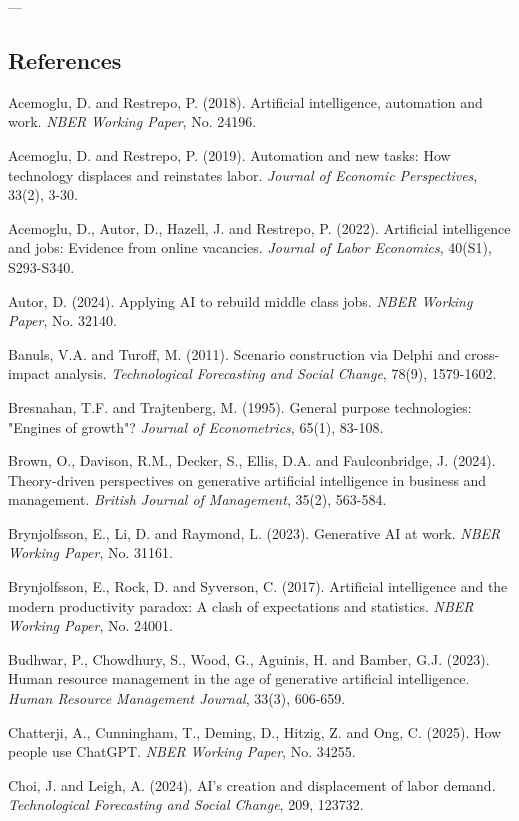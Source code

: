 \documentclass{article}
\begin{document}
---


\subsection{References}
\label{sec:references}

Acemoglu, D. and Restrepo, P. (2018). Artificial intelligence, automation and work. \textit{NBER Working Paper}, No. 24196.

Acemoglu, D. and Restrepo, P. (2019). Automation and new tasks: How technology displaces and reinstates labor. \textit{Journal of Economic Perspectives}, 33(2), 3-30.

Acemoglu, D., Autor, D., Hazell, J. and Restrepo, P. (2022). Artificial intelligence and jobs: Evidence from online vacancies. \textit{Journal of Labor Economics}, 40(S1), S293-S340.

Autor, D. (2024). Applying AI to rebuild middle class jobs. \textit{NBER Working Paper}, No. 32140.

Banuls, V.A. and Turoff, M. (2011). Scenario construction via Delphi and cross-impact analysis. \textit{Technological Forecasting and Social Change}, 78(9), 1579-1602.

Bresnahan, T.F. and Trajtenberg, M. (1995). General purpose technologies: "Engines of growth"? \textit{Journal of Econometrics}, 65(1), 83-108.

Brown, O., Davison, R.M., Decker, S., Ellis, D.A. and Faulconbridge, J. (2024). Theory-driven perspectives on generative artificial intelligence in business and management. \textit{British Journal of Management}, 35(2), 563-584.

Brynjolfsson, E., Li, D. and Raymond, L. (2023). Generative AI at work. \textit{NBER Working Paper}, No. 31161.

Brynjolfsson, E., Rock, D. and Syverson, C. (2017). Artificial intelligence and the modern productivity paradox: A clash of expectations and statistics. \textit{NBER Working Paper}, No. 24001.

Budhwar, P., Chowdhury, S., Wood, G., Aguinis, H. and Bamber, G.J. (2023). Human resource management in the age of generative artificial intelligence. \textit{Human Resource Management Journal}, 33(3), 606-659.

Chatterji, A., Cunningham, T., Deming, D., Hitzig, Z. and Ong, C. (2025). How people use ChatGPT. \textit{NBER Working Paper}, No. 34255.

Choi, J. and Leigh, A. (2024). AI's creation and displacement of labor demand. \textit{Technological Forecasting and Social Change}, 209, 123732.
\end{document}

